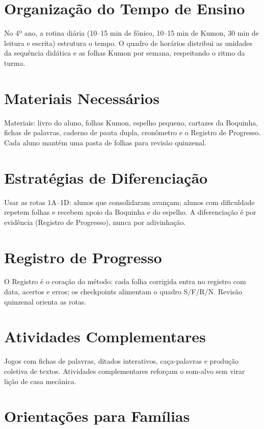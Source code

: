 
\chapter{Organização do Tempo de Ensino}

No 4º ano, a rotina diária (10–15 min de fônico, 10–15 min de Kumon, 30 min de leitura e escrita) estrutura o tempo. O quadro de horários distribui as unidades da sequência didática e as folhas Kumon por semana, respeitando o ritmo da turma.


\chapter{Materiais Necessários}

Materiais: livro do aluno, folhas Kumon, espelho pequeno, cartazes da Boquinha, fichas de palavras, caderno de pauta dupla, cronômetro e o Registro de Progresso. Cada aluno mantém uma pasta de folhas para revisão quinzenal.


\chapter{Estratégias de Diferenciação}

Usar as rotas 1A–1D: alunos que consolidaram avançam; alunos com dificuldade repetem folhas e recebem apoio da Boquinha e do espelho. A diferenciação é por evidência (Registro de Progresso), nunca por adivinhação.


\chapter{Registro de Progresso}

O Registro é o coração do método: cada folha corrigida entra no registro com data, acertos e erros; os checkpoints alimentam o quadro S/F/R/N. Revisão quinzenal orienta as rotas.


\chapter{Atividades Complementares}

Jogos com fichas de palavras, ditados interativos, caça-palavras e produção coletiva de textos. Atividades complementares reforçam o som-alvo sem virar lição de casa mecânica.


\chapter{Orientações para Famílias}

